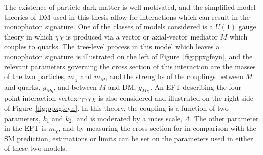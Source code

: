 The existence of particle dark matter
  is well motivated, and the simplified
  model theories of DM used in this thesis allow
  for interactions which can result in
  the monophoton signature.
 One of the classes of models considered is a $U(1)$
  gauge theory in which $\chi\overline{\chi}$
  is produced via a vector or axial-vector mediator $M$
  which couples to quarks. 
 The tree-level process in this model which leaves
  a  monophoton signature 
  is illustrated on the left of
  Figure~\ref{fig:ppxgfeyn}, and the
  relevant parameters governing
  the cross section of this interaction are
  the masses of the two particles, $m_\chi$
  and $m_M$, and the strengths of the couplings
  between $M$ and quarks, $g_{Mq}$,
  and between $M$ and DM, $g_{M\chi}$.
 An EFT describing the four-point interaction
  vertex $\gamma\gamma\chi\overline{\chi}$ is also
  considered and illustrated on the right side of
  Figure~\ref{fig:ppxgfeyn}.
 In this theory, the coupling is a function
  of two parameters, $k_1$ and $k_2$,
  and is moderated by a mass scale, $\Lambda$.
 The other parameter in the EFT is $m_\chi$,
  and by measuring the cross section for
  \ppgdm in comparison with the SM prediction,
  estimations or limits can be set on 
  the parameters used in either of these
  two models.
  
